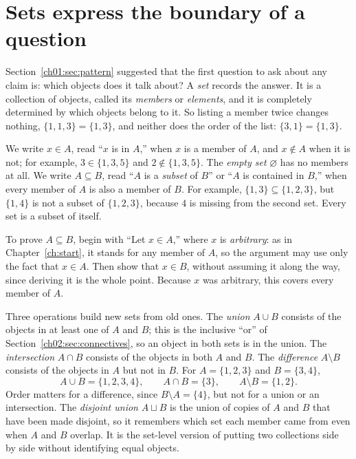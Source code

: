 \section{Sets express the boundary of a question}\label{ch03:sec:sets}
Section~\ref{ch01:sec:pattern} suggested that the first question to ask about any claim is: which objects does it talk about? A \emph{set} records the answer. It is a collection of objects, called its \emph{members} or \emph{elements}, and it is completely determined by which objects belong to it. So listing a member twice changes nothing, $\{1,1,3\}=\{1,3\}$, and neither does the order of the list: $\{3,1\}=\{1,3\}$.

We write $x\in A$, read ``$x$ is in $A$,'' when $x$ is a member of $A$, and $x\notin A$ when it is not; for example, $3\in\{1,3,5\}$ and $2\notin\{1,3,5\}$. The \emph{empty set} $\varnothing$ has no members at all. We write $A\subseteq B$, read ``$A$ is a \emph{subset} of $B$'' or ``$A$ is contained in $B$,'' when every member of $A$ is also a member of $B$. For example, $\{1,3\}\subseteq\{1,2,3\}$, but $\{1,4\}$ is not a subset of $\{1,2,3\}$, because $4$ is missing from the second set. Every set is a subset of itself.

To prove $A\subseteq B$, begin with ``Let $x\in A$,'' where $x$ is \emph{arbitrary}: as in Chapter~\ref{ch:start}, it stands for any member of $A$, so the argument may use only the fact that $x\in A$. Then show that $x\in B$, without assuming it along the way, since deriving it is the whole point. Because $x$ was arbitrary, this covers every member of $A$.

Three operations build new sets from old ones. The \emph{union} $A\cup B$ consists of the objects in at least one of $A$ and $B$; this is the inclusive ``or'' of Section~\ref{ch02:sec:connectives}, so an object in both sets is in the union. The \emph{intersection} $A\cap B$ consists of the objects in both $A$ and $B$. The \emph{difference} $A\setminus B$ consists of the objects in $A$ but not in $B$. For $A=\{1,2,3\}$ and $B=\{3,4\}$,
\[
A\cup B=\{1,2,3,4\},\qquad A\cap B=\{3\},\qquad A\setminus B=\{1,2\}.
\]
Order matters for a difference, since $B\setminus A=\{4\}$, but not for a union or an intersection. The \emph{disjoint union} $A\sqcup B$ is the union of copies of $A$ and $B$ that have been made disjoint, so it remembers which set each member came from even when $A$ and $B$ overlap. It is the set-level version of putting two collections side by side without identifying equal objects.

